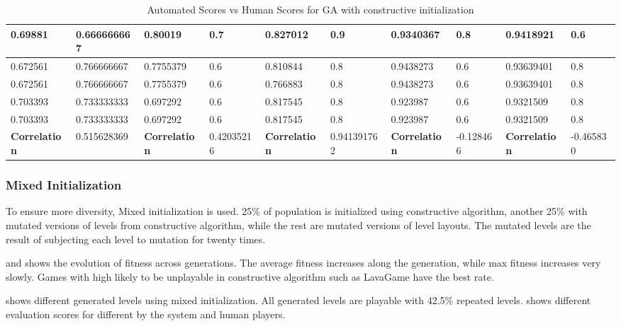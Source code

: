 \begin{landscape}
\begin{table}[!ht]
\begin{tabular}{|p{0.8in}|p{0.8in}|p{0.8in}|p{0.8in}|p{0.8in}|p{0.8in}|p{0.8in}|p{0.8in}|p{0.8in}|p{0.8in}|}
		0.69881 & 0.666666667 & 0.80019 & 0.7 & 0.827012 & 0.9 & 0.9340367 & 0.8 & 0.9418921 & 0.6\\
		\hline
		0.672561 & 0.766666667 & 0.7755379 & 0.6 & 0.810844 & 0.8 & 0.9438273 & 0.6 & 0.93639401 & 0.8\\
		\hline
		0.672561 & 0.766666667 & 0.7755379 & 0.6 & 0.766883 & 0.8 & 0.9438273 & 0.6 & 0.93639401 & 0.8\\
		\hline
		0.703393 & 0.733333333 & 0.697292 & 0.6 & 0.817545 & 0.8 & 0.923987 & 0.6 & 0.9321509 & 0.8\\
		\hline
		0.703393 & 0.733333333 & 0.697292 & 0.6 & 0.817545 & 0.8 & 0.923987 & 0.6 & 0.9321509 & 0.8\\
		\hline
		\textbf{Correlation} & 0.515628369 & \textbf{Correlation} & 0.42035216 & \textbf{Correlation} & 0.941391762 & \textbf{Correlation} & -0.128466 & \textbf{Correlation} & -0.465830\\
		\hline
	\end{tabular}
	\caption{Automated Scores vs Human Scores for GA with constructive initialization}
	\label{Table:constructiveGAScores}
\end{table}
\end{landscape}

\subsubsection{Mixed Initialization}
To ensure more diversity, Mixed initialization is used. 25\% of population is initialized using constructive algorithm, another 25\% with mutated versions of levels from constructive algorithm, while the rest are mutated versions of level layouts. The mutated levels are the result of subjecting each level to mutation for twenty times.\\\par 

 and  shows the evolution of fitness across generations. The average fitness increases along the generation, while max fitness increases very slowly. Games with high likely to be unplayable in constructive algorithm such as LavaGame have the best rate.



 shows different generated levels using mixed initialization. All generated levels are playable with 42.5\% repeated levels.  shows different evaluation scores for different by the system and human players.

